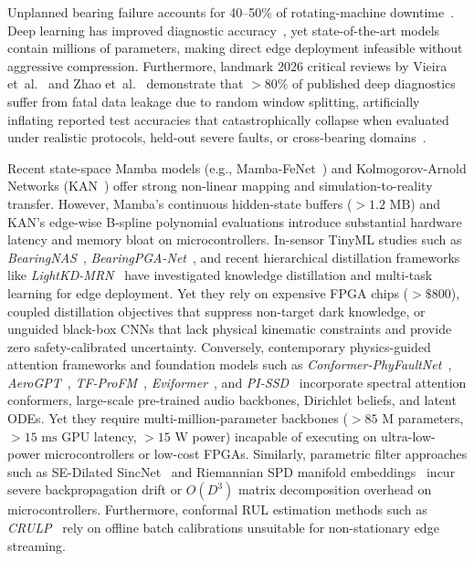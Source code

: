 \documentclass[conference]{IEEEtran}
\begin{document}
Unplanned bearing failure accounts for 40--50\% of rotating-machine
downtime~\cite{randall2011rolling}.
Deep learning has improved diagnostic accuracy~\cite{liao2024survey},
yet state-of-the-art models contain millions of parameters, making
direct edge deployment infeasible without aggressive compression.
Furthermore, landmark 2026 critical reviews by Vieira et~al.~\cite{vieira2026realistic}
and Zhao et~al.~\cite{leakage2026bearing} demonstrate that $>80\%$ of published deep
diagnostics suffer from fatal data leakage due to random window splitting,
artificially inflating reported test accuracies that catastrophically collapse
when evaluated under realistic protocols, held-out severe faults, or cross-bearing domains~\cite{heldout2026bearing}.

Recent state-space Mamba models (e.g., Mamba-FeNet~\cite{pang2026mamba}) and
Kolmogorov-Arnold Networks (KAN~\cite{wang2025kan}) offer strong non-linear
mapping and simulation-to-reality transfer. However, Mamba's continuous hidden-state
buffers ($>1.2\text{ MB}$) and KAN's edge-wise B-spline polynomial evaluations
introduce substantial hardware latency and memory bloat on microcontrollers.
In-sensor TinyML studies such as \emph{BearingNAS}~\cite{bearingnas2026},
\emph{BearingPGA-Net}~\cite{liao2024bearingpga}, and recent hierarchical distillation frameworks like \emph{LightKD-MRN}~\cite{gao2026lightkd}
have investigated knowledge distillation and multi-task learning for edge deployment. Yet they rely
on expensive FPGA chips ($>\$800$), coupled distillation objectives that suppress non-target dark knowledge,
or unguided black-box CNNs that lack physical kinematic constraints and provide zero safety-calibrated uncertainty.
Conversely, contemporary physics-guided attention frameworks and foundation models such as \emph{Conformer-PhyFaultNet}~\cite{ullah2026conformer},
\emph{AeroGPT}~\cite{liu2026aerogpt}, \emph{TF-ProFM}~\cite{pi2026tfprofm}, \emph{Eviformer}~\cite{eviformer2025}, and \emph{PI-SSD}~\cite{pissd2026}
incorporate spectral attention conformers, large-scale pre-trained audio backbones, Dirichlet beliefs, and latent ODEs.
Yet they require multi-million-parameter backbones ($>85\text{ M}$ parameters, $>15\text{ ms}$ GPU latency, $>15\text{ W}$ power)
incapable of executing on ultra-low-power microcontrollers or low-cost FPGAs.
Similarly, parametric filter approaches such as SE-Dilated SincNet~\cite{zhong2026sincnet} and Riemannian SPD manifold embeddings~\cite{cheng2026spd}
incur severe backpropagation drift or $O(D^3)$ matrix decomposition overhead on microcontrollers.
Furthermore, conformal RUL estimation methods such as \emph{CRULP}~\cite{piao2025crulp}
rely on offline batch calibrations unsuitable for non-stationary edge streaming.
\end{document}
